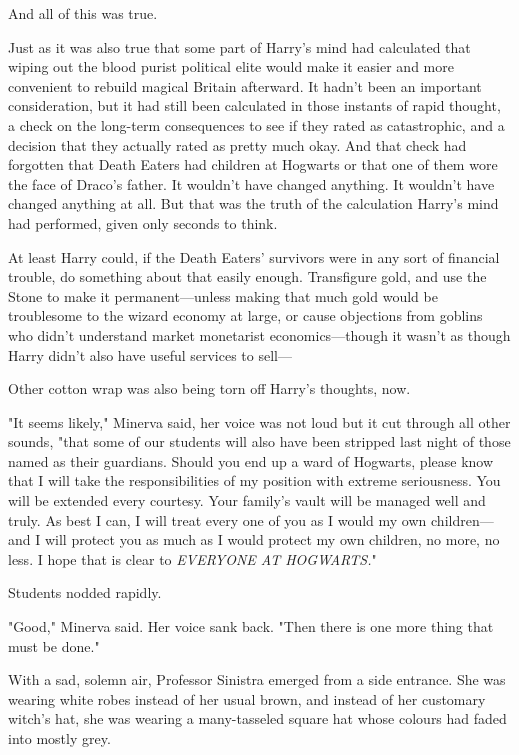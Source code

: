 And all of this was true.

Just as it was also true that some part of Harry's mind had calculated that
wiping out the blood purist political elite would make it easier and more
convenient to rebuild magical Britain afterward. It hadn't been an important
consideration, but it had still been calculated in those instants of rapid
thought, a check on the long-term consequences to see if they rated as
catastrophic, and a decision that they actually rated as pretty much okay. And
that check had forgotten that Death Eaters had children at Hogwarts or that one
of them wore the face of Draco's father. It wouldn't have changed anything. It
wouldn't have changed anything at all. But that was the truth of the
calculation Harry's mind had performed, given only seconds to think.

At least Harry could, if the Death Eaters' survivors were in any sort of
financial trouble, do something about that easily enough. Transfigure gold, and
use the Stone to make it permanent---unless making that much gold would be
troublesome to the wizard economy at large, or cause objections from goblins
who didn't understand market monetarist economics---though it wasn't as though
Harry didn't also have useful services to sell---

Other cotton wrap was also being torn off Harry's thoughts, now.

"It seems likely," Minerva said, her voice was not loud but it cut through all
other sounds, "that some of our students will also have been stripped last
night of those named as their guardians. Should you end up a ward of Hogwarts,
please know that I will take the responsibilities of my position with extreme
seriousness. You will be extended every courtesy. Your family's vault will be
managed well and truly. As best I can, I will treat every one of you as I would
my own children---and I will protect you as much as I would protect my own
children, no more, no less. I hope that is clear to \emph{EVERYONE AT
HOGWARTS.}"

Students nodded rapidly.

"Good," Minerva said. Her voice sank back. "Then there is one more thing that
must be done."

With a sad, solemn air, Professor Sinistra emerged from a side entrance. She
was wearing white robes instead of her usual brown, and instead of her
customary witch's hat, she was wearing a many-tasseled square hat whose colours
had faded into mostly grey.

